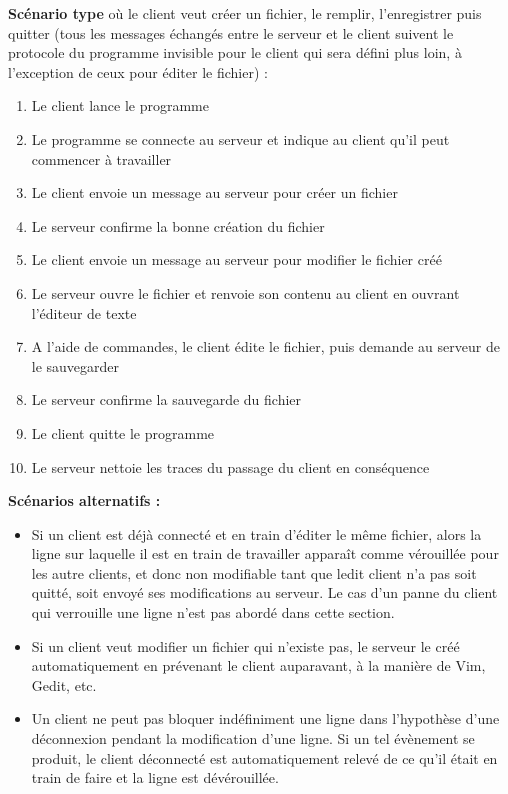 \documentclass[12pt]{article}
\begin{document}
\textbf{Scénario type} où le client veut créer un fichier, le remplir, l'enregistrer puis quitter (tous les messages échangés entre le serveur et le client suivent le protocole du programme invisible pour le client qui sera défini plus loin, à l'exception de ceux pour éditer le fichier) :

\begin{enumerate}
\item Le client lance le programme
\item Le programme se connecte au serveur et indique au client qu'il peut commencer à travailler
\item Le client envoie un message au serveur pour créer un fichier
\item Le serveur confirme la bonne création du fichier
\item Le client envoie un message au serveur pour modifier le fichier créé
\item Le serveur ouvre le fichier et renvoie son contenu au client en ouvrant l'éditeur de texte
\item A l'aide de commandes, le client édite le fichier, puis demande au serveur de le sauvegarder
\item Le serveur confirme la sauvegarde du fichier
\item Le client quitte le programme
\item Le serveur nettoie les traces du passage du client en conséquence\\
\end{enumerate}

\textbf{Scénarios alternatifs :}
\begin{itemize}
\item Si un client est déjà connecté et en train d'éditer le même fichier, alors la ligne sur laquelle il est en train de travailler apparaît comme vérouillée pour les autre clients, et donc non modifiable tant que ledit client n'a pas soit quitté, soit envoyé ses modifications au serveur. Le cas d'un panne du client qui verrouille une ligne n'est pas abordé dans cette section.
\item Si un client veut modifier un fichier qui n'existe pas, le serveur le créé automatiquement en prévenant le client auparavant, à la manière de Vim, Gedit, etc.
\item Un client ne peut pas bloquer indéfiniment une ligne dans l'hypothèse d'une déconnexion pendant la modification d'une ligne. Si un tel évènement se produit, le client déconnecté est automatiquement relevé de ce qu'il était en train de faire et la ligne est dévérouillée.
\end{itemize}
\end{document}
